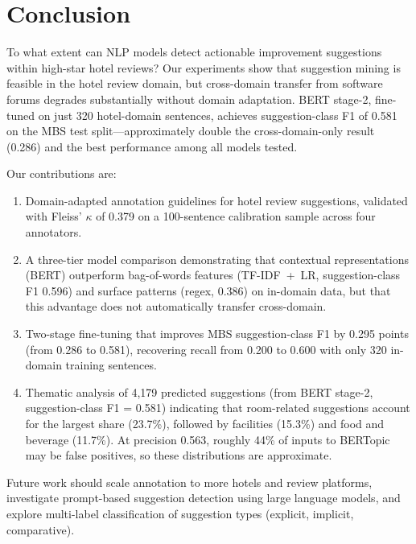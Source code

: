 \section{Conclusion}

To what extent can NLP models detect actionable improvement
suggestions within high-star hotel reviews? Our experiments show
that suggestion mining is feasible in the hotel review domain, but
cross-domain transfer from software forums degrades substantially
without domain adaptation. BERT stage-2, fine-tuned on just 320
hotel-domain sentences, achieves suggestion-class F1 of 0.581 on
the MBS test split---approximately double the cross-domain-only
result (0.286) and the best performance among all models tested.

Our contributions are:
\begin{enumerate}
  \item Domain-adapted annotation guidelines for hotel review
  suggestions, validated with Fleiss' $\kappa$ of 0.379 on a
  100-sentence calibration sample across four annotators.
  \item A three-tier model comparison demonstrating that
  contextual representations (BERT) outperform bag-of-words
  features (TF-IDF~+~LR, suggestion-class F1 0.596) and surface
  patterns (regex, 0.386) on in-domain data, but that this
  advantage does not automatically transfer cross-domain.
  \item Two-stage fine-tuning that improves MBS suggestion-class
  F1 by 0.295 points (from 0.286 to 0.581), recovering recall
  from 0.200 to 0.600 with only 320 in-domain training sentences.
  \item Thematic analysis of 4,179 predicted suggestions (from
  BERT stage-2, suggestion-class F1 = 0.581) indicating that
  room-related suggestions account for the largest share
  (23.7\%), followed by facilities (15.3\%) and food and
  beverage (11.7\%). At precision 0.563, roughly 44\% of inputs
  to BERTopic may be false positives, so these distributions are
  approximate.
\end{enumerate}

Future work should scale annotation to more hotels and review
platforms, investigate prompt-based suggestion detection using
large language models, and explore multi-label classification of
suggestion types (explicit, implicit, comparative).
